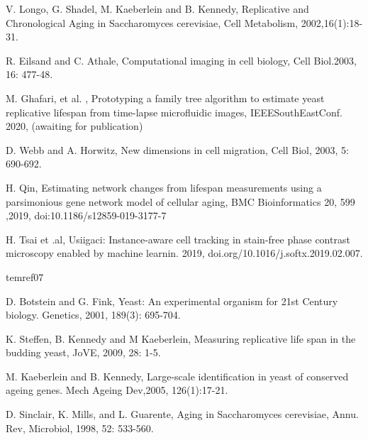 \documentclass[conference]{IEEEtran}
\begin{document}
\begin{thebibliography}{00}

V. Longo, G. Shadel, M. Kaeberlein and B.  Kennedy, Replicative and Chronological Aging in Saccharomyces cerevisiae, Cell Metabolism, 2002,16(1):18-31.


R. Eilsand and C. Athale, Computational imaging in cell biology, Cell Biol.2003, 16: 477-48.

M. Ghafari,  et al. , Prototyping a family tree algorithm to estimate yeast replicative lifespan from time-lapse microfluidic images, IEEESouthEastConf. 2020, (awaiting for publication)


D. Webb and A. Horwitz, New dimensions in cell migration, Cell Biol, 2003,  5: 690-692.


H. Qin, Estimating network changes from lifespan measurements using a parsimonious gene network model of cellular aging, BMC Bioinformatics 20, 599 ,2019, doi:10.1186/s12859-019-3177-7









H. Tsai et .al, Usiigaci: Instance-aware cell tracking in stain-free phase contrast microscopy enabled by machine learnin. 2019, doi.org/10.1016/j.softx.2019.02.007.

\bibi



tem{ref07}

D. Botstein and G. Fink, Yeast: An experimental organism for 21st Century biology. Genetics, 2001, 189(3): 695-704.



K. Steffen, B. Kennedy and M Kaeberlein, Measuring replicative life span in the budding yeast, JoVE, 2009,  28: 1-5.


M. Kaeberlein and B. Kennedy, Large-scale identification in yeast of conserved ageing genes. Mech Ageing Dev,2005, 126(1):17-21.


D. Sinclair, K. Mills, and L. Guarente,  Aging in Saccharomyces cerevisiae, Annu. Rev,  Microbiol, 1998, 52: 533-560.



\end{thebibliography}
\end{document}
